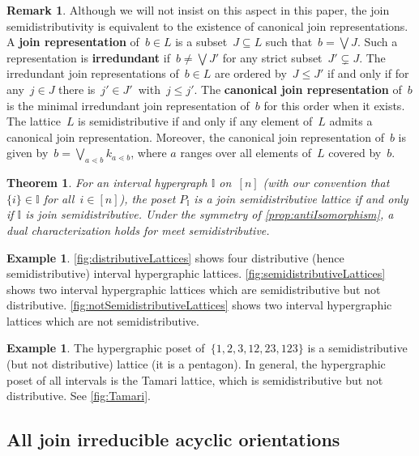 \documentclass{amsart}
\newtheorem{theoremA}{Theorem}
\theoremstyle{definition}
\newtheorem{example}[theorem]{Example}
\newtheorem{remark}[theorem]{Remark}
\newcommand{\defn}[1]{\textbf{\textsf{\color{PineGreen} #1}}} %
\newcommand{\bigJoin}{\bigvee} %
\newcommand{\II}{\mathbb I} %
\begin{document}
\begin{remark}
Although we will not insist on this aspect in this paper, the join semidistributivity is equivalent to the existence of canonical join representations.
A \defn{join representation} of~${b \in L}$ is a subset~$J \subseteq L$ such that~$b = \bigJoin J$.
Such a representation is \defn{irredundant} if~$b \ne \bigJoin J'$ for any strict subset~$J' \subsetneq J$.
The irredundant join representations of~$b \in L$ are ordered by~$J \le J'$ if and only if for any~$j \in J$ there is~${j' \in J'}$~with~$j \le j'$.
The \defn{canonical join representation} of~$b$ is the minimal irredundant join representation of~$b$ for this order when it exists.
The lattice~$L$ is semidistributive if and only if any element of~$L$ admits a canonical join representation.
Moreover, the canonical join representation of~$b$ is given by~$b = \bigJoin_{a \lessdot b} k_{a \lessdot b}$, where $a$ ranges over all elements of~$L$ covered by~$b$.
\end{remark}

\begin{theoremA}
For an interval hypergraph $\II$ on~$[n]$ (with our convention that~$\{i\} \in \II$ for all~$i \in [n]$), the poset $P_\II$ is a join semidistributive lattice if and only if $\II$ is join semidistributive.
Under the symmetry of \cref{prop:antiIsomorphism}, a dual characterization holds for meet semidistributive.
\end{theoremA}

\begin{example}
\cref{fig:distributiveLattices} shows four distributive (hence semidistributive) interval hypergraphic lattices.
%
\cref{fig:semidistributiveLattices} shows two interval hypergraphic lattices which are semidistributive but not distributive.
%
\cref{fig:notSemidistributiveLattices} shows two interval hypergraphic lattices which are not semidistributive.
\end{example}

\begin{example}
The hypergraphic poset of~$\{ 1, 2, 3, 12, 23, 123 \}$ is a semidistributive (but not distributive) lattice (it is a pentagon).
In general, the hypergraphic poset of all intervals is the Tamari lattice, which is semidistributive but not distributive.
See \cref{fig:Tamari}.
\end{example}


\subsection{All join irreducible acyclic orientations}
\label{subsec:joinIrreducibles}
\end{document}
